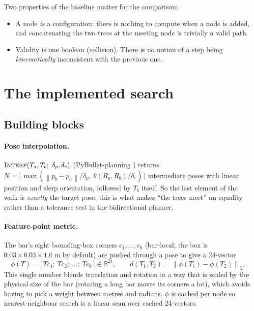 \documentclass[11pt,a4paper]{article}
\newcommand{\code}[1]{\texttt{\detokenize{#1}}}
\newcommand{\R}{\mathbb{R}}
\newcommand{\norm}[1]{\left\lVert #1 \right\rVert}
\newcommand{\fn}[1]{\textsc{#1}}
\begin{document}
\noindent
Two properties of the baseline matter for the comparison:
\begin{itemize}[nosep]
  \item A node \emph{is} a configuration; there is nothing to compute when a
        node is added, and concatenating the two trees at the meeting node is
        trivially a valid path.
  \item Validity is one boolean (collision). There is no notion of a step
        being \emph{kinematically} inconsistent with the previous one.
\end{itemize}

\section{The implemented search}
\label{sec:impl}

\subsection{Building blocks}

\paragraph{Pose interpolation.}
$\fn{Interp}(T_a, T_b;\ \delta_p, \delta_r)$ (PyBullet-planning
\code{interpolate_poses}) returns
$N = \lceil \max(\norm{p_b - p_a}/\delta_p,\ \theta(R_a,R_b)/\delta_r) \rceil$
intermediate poses with linear position and slerp orientation, followed by
$T_b$ itself. So the last element of the walk is \emph{exactly} the target
pose; this is what makes ``the trees meet'' an equality rather than a
tolerance test in the bidirectional planner.

\paragraph{Feature-point metric.}
The bar's eight bounding-box corners $c_1,\dots,c_8$ (bar-local; the box is
$0.03 \times 0.03 \times 1.0$ m by default) are pushed through a pose to give
a 24-vector
\begin{equation}
  \phi(T) = \bigl[\,T c_1;\ T c_2;\ \dots;\ T c_8\,\bigr] \in \R^{24},
  \qquad
  d(T_1, T_2) = \norm{\phi(T_1) - \phi(T_2)}_2 .
  \label{eq:feature}
\end{equation}
This single number blends translation and rotation in a way that is scaled by
the physical size of the bar (rotating a long bar moves its corners a lot),
which avoids having to pick a weight between metres and radians. $\phi$ is
cached per node so nearest-neighbour search is a linear scan over cached
24-vectors.
\end{document}

